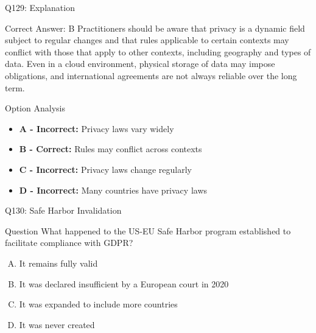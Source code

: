 \documentclass{beamer}
\begin{document}
	\begin{frame}{Q129: Explanation}
		\begin{block}{Correct Answer: B}
			Practitioners should be aware that privacy is a dynamic field subject to regular changes and that rules applicable to certain contexts may conflict with those that apply to other contexts, including geography and types of data. Even in a cloud environment, physical storage of data may impose obligations, and international agreements are not always reliable over the long term.
		\end{block}
		\begin{block}{Option Analysis}
			\begin{itemize}
				\item \textbf{A - Incorrect:} Privacy laws vary widely
				\item \textbf{B - Correct:} Rules may conflict across contexts
				\item \textbf{C - Incorrect:} Privacy laws change regularly
				\item \textbf{D - Incorrect:} Many countries have privacy laws
			\end{itemize}
		\end{block}
	\end{frame}
	
	\begin{frame}{Q130: Safe Harbor Invalidation}
		\begin{block}{Question}
			What happened to the US-EU Safe Harbor program established to facilitate compliance with GDPR?
		\end{block}
		\begin{enumerate}[(A)]
			\item It remains fully valid
			\item It was declared insufficient by a European court in 2020
			\item It was expanded to include more countries
			\item It was never created
		\end{enumerate}
	\end{frame}
	
\end{document}
